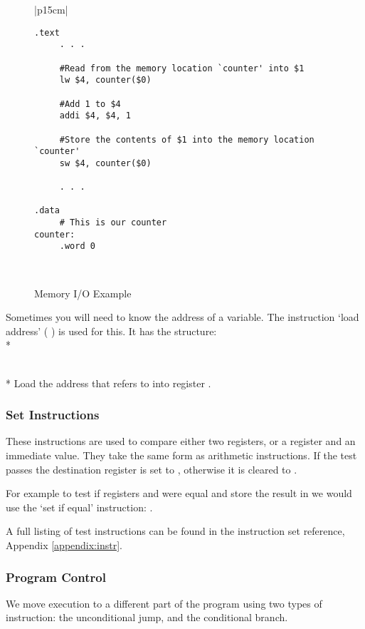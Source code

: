 \begin{figure}[btp]
\begin{center}
\begin{tabular}{|p{15cm}|}
\hline
\begin{verbatim}
.text
     . . .

     #Read from the memory location `counter' into $1
     lw $4, counter($0)

     #Add 1 to $4
     addi $4, $4, 1

     #Store the contents of $1 into the memory location `counter'
     sw $4, counter($0)

     . . .
     
.data
     # This is our counter
counter:
     .word 0 
\end{verbatim}%
\\
\hline
\end{tabular}
\end{center}
\caption{Memory I/O Example}
\label{memio}
\end{figure}

Sometimes you will need to know the address of a variable.  The 
instruction `load address' (  ) is used for this. It has the 
structure:
\\*

 \\*
Load the address that  refers to into register \regd.  

\subsubsection{Set Instructions}
These instructions are used to compare either two registers, or a
register and an immediate value.  They take the same form as
arithmetic instructions.  If the test passes the destination register
is set to , otherwise it is cleared to .

For example to test if registers  and  were equal and store the
result in  we would use the `set if equal' instruction: 
.

A full listing of test instructions can be found in the instruction set reference, Appendix \ref{appendix:instr}.

\subsubsection{Program Control}
We move execution to a different part of the program using two types of 
instruction: the unconditional jump, and the conditional branch.  

